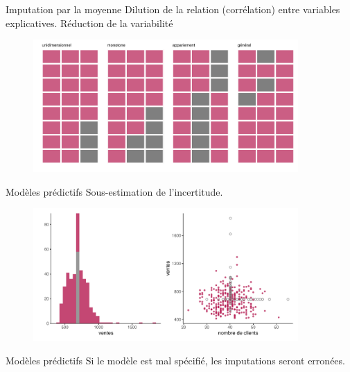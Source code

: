 \documentclass[
  ignorenonframetext,
]{beamer}
\begin{document}
\begin{frame}{Imputation par la moyenne}
\protect\hypertarget{imputation-par-la-moyenne}{}
Dilution de la relation (corrélation) entre variables explicatives.
Réduction de la variabilité

\begin{figure}

{\centering \includegraphics[width=0.9\textwidth,height=\textheight]{MATH60602-diapos13_files/figure-beamer/unnamed-chunk-1-1.pdf}

}

\end{figure}
\end{frame}

\begin{frame}{Modèles prédictifs}
\protect\hypertarget{moduxe8les-pruxe9dictifs}{}
Sous-estimation de l'incertitude.

\begin{figure}

{\centering \includegraphics[width=0.9\textwidth,height=\textheight]{MATH60602-diapos13_files/figure-beamer/unnamed-chunk-2-1.pdf}

}

\end{figure}
\end{frame}

\begin{frame}{Modèles prédictifs}
\protect\hypertarget{moduxe8les-pruxe9dictifs-1}{}
Si le modèle est mal spécifié, les imputations seront erronées.
\end{frame}
\end{document}
